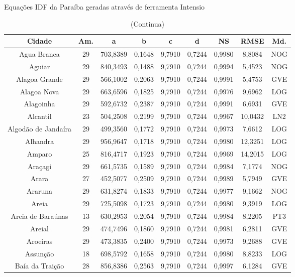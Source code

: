 \begin{table}[ht]
\centering
\caption{Equações IDF da Paraíba geradas através de ferramenta Intensio}
\captionsetup{justification=raggedleft,singlelinecheck=false}
\caption*{(Continua)}
\small
\begin{tabular}{ccccccccc}
\hline
\textbf{Cidade} & \textbf{Am.} & \textbf{a} & \textbf{b} & \textbf{c} & \textbf{d} & \textbf{NS} & \textbf{RMSE} & \textbf{Md.} \\ \hline
Agua Branca & 29 & 703,8389 & 0,1648 & 9,7910 & 0,7244 & 0,9980 & 8,8084 & NOG \\
Aguiar & 29 & 840,3493 & 0,1488 & 9,7910 & 0,7244 & 0,9994 & 5,4523 & NOG \\
Alagoa Grande & 29 & 566,1002 & 0,2063 & 9,7910 & 0,7244 & 0,9991 & 5,4753 & GVE \\
Alagoa Nova & 29 & 663,6596 & 0,1825 & 9,7910 & 0,7244 & 0,9976 & 9,6962 & LOG \\
Alagoinha & 29 & 592,6732 & 0,2387 & 9,7910 & 0,7244 & 0,9991 & 6,6931 & GVE \\
Alcantil & 23 & 504,2508 & 0,2199 & 9,7910 & 0,7244 & 0,9967 & 10,0432 & LN2 \\
Algodão de Jandaíra & 29 & 499,3560 & 0,1772 & 9,7910 & 0,7244 & 0,9973 & 7,6612 & LOG \\
Alhandra & 29 & 956,9647 & 0,1718 & 9,7910 & 0,7244 & 0,9980 & 12,3251 & LOG \\
Amparo & 25 & 816,4717 & 0,1923 & 9,7910 & 0,7244 & 0,9969 & 14,2015 & LOG \\
Araçagi & 29 & 661,5735 & 0,1589 & 9,7910 & 0,7244 & 0,9984 & 7,1774 & NOG \\
Arara & 27 & 452,5077 & 0,2509 & 9,7910 & 0,7244 & 0,9989 & 5,7949 & GVE \\
Araruna & 29 & 631,8274 & 0,1833 & 9,7910 & 0,7244 & 0,9977 & 9,1662 & NOG \\
Areia & 29 & 725,5098 & 0,1723 & 9,7910 & 0,7244 & 0,9980 & 9,3919 & LOG \\
Areia de Baraúnas & 13 & 630,2953 & 0,2054 & 9,7910 & 0,7244 & 0,9984 & 8,2205 & PT3 \\
Areial & 29 & 474,7496 & 0,1860 & 9,7910 & 0,7244 & 0,9981 & 6,2811 & GVE \\
Aroeiras & 29 & 473,3835 & 0,2400 & 9,7910 & 0,7244 & 0,9973 & 9,2688 & GVE \\
Assunção & 18 & 698,5792 & 0,1658 & 9,7910 & 0,7244 & 0,9980 & 8,8233 & LOG \\
Baía da Traição & 28 & 856,8386 & 0,2563 & 9,7910 & 0,7244 & 0,9997 & 6,1284 & GVE \\

\end{tabular}
\end{table}
